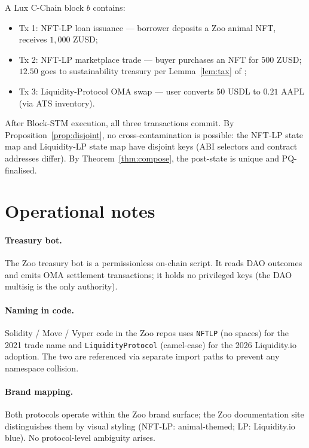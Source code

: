 \documentclass[11pt]{article}
\begin{document}
A Lux C-Chain block $b$ contains:
\begin{itemize}[nosep]
  \item Tx 1: NFT-LP loan issuance --- borrower deposits a Zoo
        animal NFT, receives $1{,}000$ ZUSD;
  \item Tx 2: NFT-LP marketplace trade --- buyer purchases an NFT
        for $500$ ZUSD; $12.50$ goes to sustainability treasury
        per Lemma~\ref{lem:tax} of \cite{zoo-nft-lp};
  \item Tx 3: Liquidity-Protocol OMA swap --- user converts
        $50$ USDL to $0.21$ AAPL (via ATS inventory).
\end{itemize}

After Block-STM execution, all three transactions commit. By
Proposition~\ref{prop:disjoint}, no cross-contamination is possible:
the NFT-LP state map and Liquidity-LP state map have disjoint keys
(ABI selectors and contract addresses differ). By
Theorem~\ref{thm:compose}, the post-state is unique and
PQ-finalised.

\section{Operational notes}
\label{sec:ops}

\paragraph{Treasury bot.}
The Zoo treasury bot is a permissionless on-chain script. It
reads DAO outcomes and emits OMA settlement transactions; it holds
no privileged keys (the DAO multisig is the only authority).

\paragraph{Naming in code.}
Solidity / Move / Vyper code in the Zoo repos uses \texttt{NFTLP}
(no spaces) for the 2021 trade name and
\texttt{LiquidityProtocol} (camel-case) for the 2026 Liquidity.io
adoption. The two are referenced via separate import paths to
prevent any namespace collision.

\paragraph{Brand mapping.}
Both protocols operate within the Zoo brand surface; the Zoo
documentation site distinguishes them by visual styling
(NFT-LP: animal-themed; LP: Liquidity.io blue). No protocol-level
ambiguity arises.
\end{document}
